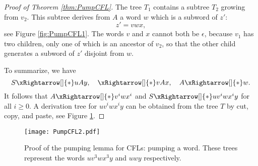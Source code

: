 \begin{proof}[Proof of Theorem \ref{thm:PumpCFL}]
The tree $T_1$ contains a subtree $T_2$ growing from $v_2$.
This subtree derives from $A$ a word $w$ which is a subword of $z'$:
\[
z' = vwx,
\]
see Figure \ref{fig:PumpCFL1}.
The words $v$ and $x$ cannot both be $\epsilon$, because $v_1$ has two children, only one of which is an ancestor of $v_2$,
so that the other child generates a subword of $z'$ disjoint from $w$.

To summarize, we have
\[
S \xRightarrow[]{*} uAy, \quad \xRightarrow[]{*} vAx, \quad A \xRightarrow[]{*} w.
\]
It follows that $A \xRightarrow[]{*} v^iwx^i$ and $S \xRightarrow[]{*} uv^iwx^iy$ for all $i \ge 0$.
A derivation tree for $uv^iwx^iy$ can be obtained from the tree $T$ by cut, copy, and paste, see Figure \ref{fig:PumpCFL2}.
\end{proof}

\begin{figure}[ht]
\begin{center}
\texttt{[image: PumpCFL2.pdf]}
\end{center}
\caption{Proof of the pumping lemma for CFLs: pumping a word. These trees represent the words $uv^3wx^3y$ and $uwy$ respectively.}
\label{fig:PumpCFL2}
\end{figure}



